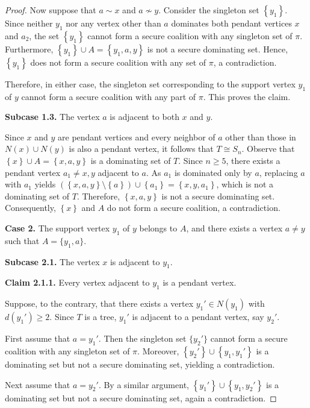 \documentclass[10pt,a4paper]{amsart}
\begin{document}
\begin{proof}
Now suppose that $a\sim x$ and $a\not\sim y$. Consider the singleton set $\left\{y_1\right\}$. Since neither $y_1$ nor any vertex other than $a$ dominates both pendant vertices $x$ and $a_2$, the set $\left\{y_1\right\}$ cannot form a secure coalition with any singleton set of $\pi$. Furthermore,
$\left\{y_1\right\}\cup A=\left\{y_1,a,y\right\}$ is not a secure dominating set. Hence, $\left\{y_1\right\}$ does not form a secure coalition with any set of $\pi$, a contradiction.

Therefore, in either case, the singleton set corresponding to the support vertex $y_1$ of $y$ cannot form a secure coalition with any part of $\pi$. This proves the claim.

\textbf{Subcase 1.3.} The vertex $a$ is adjacent to both $x$ and $y$.

Since $x$ and $y$ are pendant vertices and every neighbor of $a$ other than those in $N(x)\cup N(y)$ is also a pendant vertex, it follows that $T\cong S_n$.
Observe that $\left\{x\right\}\cup A=\left\{x,a,y\right\}$
is a dominating set of $T$. Since $n\ge 5$, there exists a pendant vertex $a_1\neq x,y$ adjacent to $a$. As $a_1$ is dominated only by $a$, replacing $a$ with $a_1$ yields
$(\left\{x,a,y\right\}\setminus\left\{a\right\})\cup\left\{a_1\right\}=\left\{x,y,a_1\right\}$, which is not a dominating set of $T$. Therefore, $\left\{x,a,y\right\}$ is not a secure dominating set. Consequently, $\left\{x\right\}$ and $A$ do not form a secure coalition, a contradiction.

\textbf{Case 2.} The support vertex $y_1$ of $y$ belongs to $A$, and there exists a vertex $a\neq y$ such that $A=\{y_1,a\}$.

\textbf{Subcase 2.1.} The vertex $x$ is adjacent to $y_1$.

\textbf{Claim 2.1.1.} Every vertex adjacent to $y_1$ is a pendant vertex.

Suppose, to the contrary, that there exists a vertex $y_1'\in N(y_1)$ with $d(y_1')\ge 2$. Since $T$ is a tree, $y_1'$ is adjacent to a pendant vertex, say $y_2'$.

First assume that $a=y_1'$. Then the singleton set $\{y_2'\}$ cannot form a secure coalition with any singleton set of $\pi$. Moreover,
$\left\{y_2'\right\}\cup\left\{y_1,y_1'\right\}$
is a dominating set but not a secure dominating set, yielding a contradiction.

Next assume that $a=y_2'$. By a similar argument,
$\left\{y_1'\right\}\cup\left\{y_1,y_2'\right\}$
is a dominating set but not a secure dominating set, again a contradiction.


\end{proof}
\end{document}
